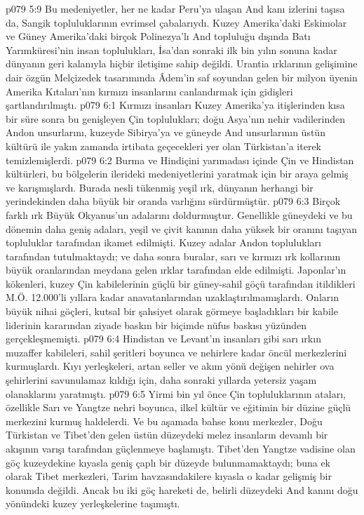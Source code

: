 \vs p079 5:9 Bu medeniyetler, her ne kadar Peru’ya ulaşan And kanı izlerini taşısa da, Sangik topluluklarının evrimsel çabalarıydı. Kuzey Amerika’daki Eskimolar ve Güney Amerika’daki birçok Polinezya’lı And topluluğu dışında Batı Yarımküresi’nin insan toplulukları, İsa’dan sonraki ilk bin yılın sonuna kadar dünyanın geri kalanıyla hiçbir iletişime sahip değildi. Urantia ırklarının gelişimine dair özgün Melçizedek tasarımında Âdem’in saf soyundan gelen bir milyon üyenin Amerika Kıtaları’nın kırmızı insanlarını canlandırmak için gidişleri şartlandırılmıştı.
\vs p079 6:1 Kırmızı insanları Kuzey Amerika’ya itişlerinden kısa bir süre sonra bu genişleyen Çin toplulukları; doğu Asya’nın nehir vadilerinden Andon unsurlarını, kuzeyde Sibirya’ya ve güneyde And unsurlarının üstün kültürü ile yakın zamanda irtibata geçecekleri yer olan Türkistan’a iterek temizlemişlerdi.
\vs p079 6:2 Burma ve Hindiçini yarımadası içinde Çin ve Hindistan kültürleri, bu bölgelerin ilerideki medeniyetlerini yaratmak için bir araya gelmiş ve karışmışlardı. Burada nesli tükenmiş yeşil ırk, dünyanın herhangi bir yerindekinden daha büyük bir oranda varlığını sürdürmüştür.
\vs p079 6:3 Birçok farklı ırk Büyük Okyanus’un adalarını doldurmuştur. Genellikle güneydeki ve bu dönemin daha geniş adaları, yeşil ve çivit kanının daha yüksek bir oranını taşıyan topluluklar tarafından ikamet edilmişti. Kuzey adalar Andon toplulukları tarafından tutulmaktaydı; ve daha sonra buralar, sarı ve kırmızı ırk kollarının büyük oranlarından meydana gelen ırklar tarafından elde edilmişti. Japonlar’ın kökenleri, kuzey Çin kabilelerinin güçlü bir güney\hyp{}sahil göçü tarafından itildikleri M.Ö. 12.000’li yıllara kadar anavatanlarından uzaklaştırılmamışlardı. Onların büyük nihai göçleri, kutsal bir şahsiyet olarak görmeye başladıkları bir kabile liderinin kararından ziyade baskın bir biçimde nüfus baskısı yüzünden gerçekleşmemişti.
\vs p079 6:4 Hindistan ve Levant’ın insanları gibi sarı ırkın muzaffer kabileleri, sahil şeritleri boyunca ve nehirlere kadar öncül merkezlerini kurmuşlardı. Kıyı yerleşkeleri, artan seller ve akım yönü değişen nehirler ova şehirlerini savunulamaz kıldığı için, daha sonraki yıllarda yetersiz yaşam olanaklarını yaratmıştı.
\vs p079 6:5 Yirmi bin yıl önce Çin topluluklarının ataları, özellikle Sarı ve Yangtze nehri boyunca, ilkel kültür ve eğitimin bir düzine güçlü merkezini kurmuş haldelerdi. Ve bu aşamada bahse konu merkezler, Doğu Türkistan ve Tibet’den gelen üstün düzeydeki melez insanların devamlı bir akışının varışı tarafından güçlenmeye başlamıştı. Tibet’den Yangtze vadisine olan göç kuzeydekine kıyasla geniş çaplı bir düzeyde bulunmamaktaydı; buna ek olarak Tibet merkezleri, Tarim havzasındakilere kıyasla o kadar gelişmiş bir konumda değildi. Ancak bu iki göç hareketi de, belirli düzeydeki And kanını doğu yönündeki kuzey yerleşkelerine taşımıştı.
